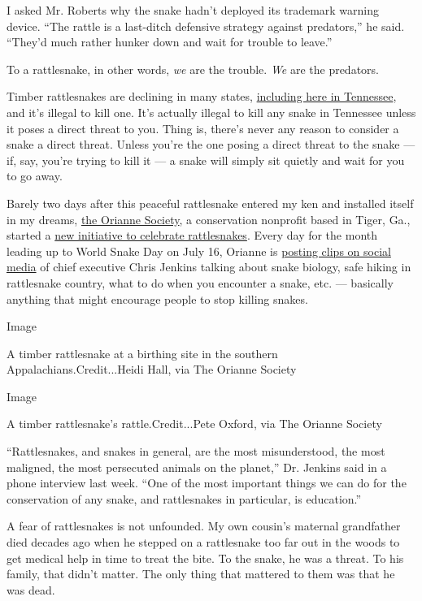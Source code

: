 I asked Mr. Roberts why the snake hadn't deployed its trademark warning
device. ``The rattle is a last-ditch defensive strategy against
predators,'' he said. ``They'd much rather hunker down and wait for
trouble to leave.''

To a rattlesnake, in other words, \emph{we} are the trouble. \emph{We}
are the predators.

Timber rattlesnakes are declining in many states,
\href{https://www.tn.gov/twra/wildlife/reptiles/snakes/timber-rattlesnake.html\#:~:text=The\%20Timber\%20Rattlesnake\%20is\%20is,the\%20end\%20of\%20the\%20tail.}{including
here in Tennessee}, and it's illegal to kill one. It's actually illegal
to kill any snake in Tennessee unless it poses a direct threat to you.
Thing is, there's never any reason to consider a snake a direct threat.
Unless you're the one posing a direct threat to the snake --- if, say,
you're trying to kill it --- a snake will simply sit quietly and wait
for you to go away.

Barely two days after this peaceful rattlesnake entered my ken and
installed itself in my dreams,
\href{https://www.oriannesociety.org/}{the Orianne Society}, a
conservation nonprofit based in Tiger, Ga., started a
\href{https://www.oriannesociety.org/uncategorized/rattlesnakes-protect-educate-conserve/}{new
initiative to celebrate rattlesnakes}. Every day for the month leading
up to World Snake Day on July 16, Orianne is
\href{https://www.youtube.com/channel/UCFTl5TKVlFzTw2I3J-U09Mg}{posting
clips on social media} of chief executive Chris Jenkins talking about
snake biology, safe hiking in rattlesnake country, what to do when you
encounter a snake, etc. --- basically anything that might encourage
people to stop killing snakes.

Image

A timber rattlesnake at a birthing site in the southern
Appalachians.Credit...Heidi Hall, via The Orianne Society

Image

A timber rattlesnake's rattle.Credit...Pete Oxford, via The Orianne
Society

``Rattlesnakes, and snakes in general, are the most misunderstood, the
most maligned, the most persecuted animals on the planet,'' Dr. Jenkins
said in a phone interview last week. ``One of the most important things
we can do for the conservation of any snake, and rattlesnakes in
particular, is education.''

A fear of rattlesnakes is not unfounded. My own cousin's maternal
grandfather died decades ago when he stepped on a rattlesnake too far
out in the woods to get medical help in time to treat the bite. To the
snake, he was a threat. To his family, that didn't matter. The only
thing that mattered to them was that he was dead.

